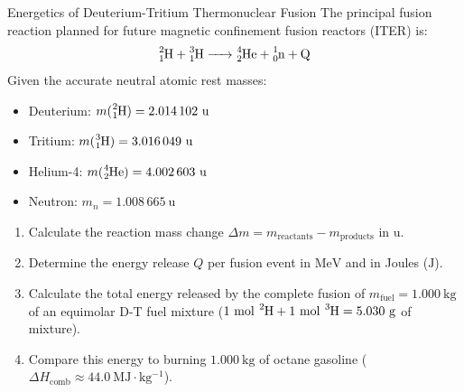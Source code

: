 \begin{exercise}{Energetics of Deuterium-Tritium Thermonuclear Fusion}
The principal fusion reaction planned for future magnetic confinement fusion reactors (ITER) is:
\[
\ce{^{2}_{1}H + ^{3}_{1}H -> ^{4}_{2}He + ^{1}_{0}n + Q}
\]
Given the accurate neutral atomic rest masses:
\begin{itemize}[itemsep=1pt]
  \item Deuterium: $m(\ce{^{2}_{1}H}) = 2.014\,102\ \mathrm{u}$
  \item Tritium: $m(\ce{^{3}_{1}H}) = 3.016\,049\ \mathrm{u}$
  \item Helium-4: $m(\ce{^{4}_{2}He}) = 4.002\,603\ \mathrm{u}$
  \item Neutron: $m_n = 1.008\,665\ \mathrm{u}$
\end{itemize}
\begin{enumerate}[leftmargin=1.5em,itemsep=2pt]
  \item Calculate the reaction mass change $\Delta m = m_{\text{reactants}} - m_{\text{products}}$ in $\mathrm{u}$.
  \item Determine the energy release $Q$ per fusion event in $\mathrm{MeV}$ and in Joules ($\mathrm{J}$).
  \item Calculate the total energy released by the complete fusion of $m_{\text{fuel}} = 1.000\ \mathrm{kg}$ of an equimolar $\mathrm{D}$-$\mathrm{T}$ fuel mixture ($1\ \mathrm{mol}\ \ce{^2H} + 1\ \mathrm{mol}\ \ce{^3H} = 5.030\ \mathrm{g}$ of mixture).
  \item Compare this energy to burning $1.000\ \mathrm{kg}$ of octane gasoline ($\Delta H_{\text{comb}} \approx 44.0\ \mathrm{MJ\cdot kg^{-1}}$).
\end{enumerate}
\end{exercise}

\begin{tabletworkspace}[5.0cm]
\end{tabletworkspace}

